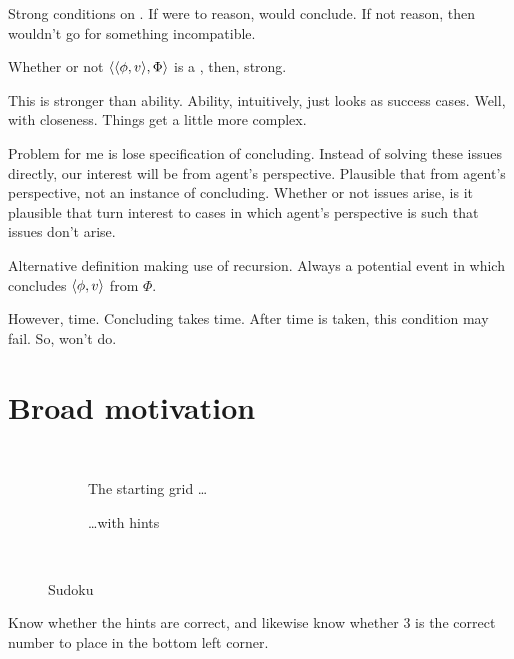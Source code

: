 {
  \color{red}
  Strong conditions on .
  If were to reason, would conclude.
  If not reason, then wouldn't go for something incompatible.

  Whether or not \(\langle \langle \phi, v \rangle, \Phi \rangle\) is a \fc{}, then, strong.

  This is stronger than ability.
  Ability, intuitively, just looks as success cases.
  Well, with closeness.
  Things get a little more complex.

  Problem for me is lose specification of concluding.
  Instead of solving these issues directly, our interest will be from agent's perspective.
  Plausible that from agent's perspective, not an instance of concluding.
  Whether or not issues arise, is it plausible that turn interest to cases in which agent's perspective is such that issues don't arise.
}

\begin{note}[`Flat']
  Alternative definition making use of recursion.
  Always a potential event in which concludes \(\langle \phi, v \rangle\) from \(\Phi\).

  However, time.
  Concluding takes time.
  After time is taken, this condition may fail.
  So, won't do.
\end{note}


\section{Broad motivation}
\label{cha:fcs:sec:broad-motivation}

\begin{note}
  \begin{illustration}[Sudoku]
    \label{illu:gist:sudoku}
    \begin{figure}[H]
      \mbox{ }\hfill
      \begin{subfigure}{0.45\linewidth}
        \centering
        \sudokuGrid{}
        \caption{The starting grid \dots}
        \label{fig:sudoku:grid}
      \end{subfigure}
      \hfill
      \begin{subfigure}{0.45\linewidth}
        \centering
        \sudokuGridHints{}
        \caption{\dots with hints}
        \label{fig:sudoku:hint}
      \end{subfigure}
      \hfill\mbox{ }
      \caption{Sudoku}
      \label{fig:sudoku}
    \end{figure}
    Know whether the hints are correct, and likewise know whether 3 is the correct number to place in the bottom left corner.
  \end{illustration}
\end{note}

